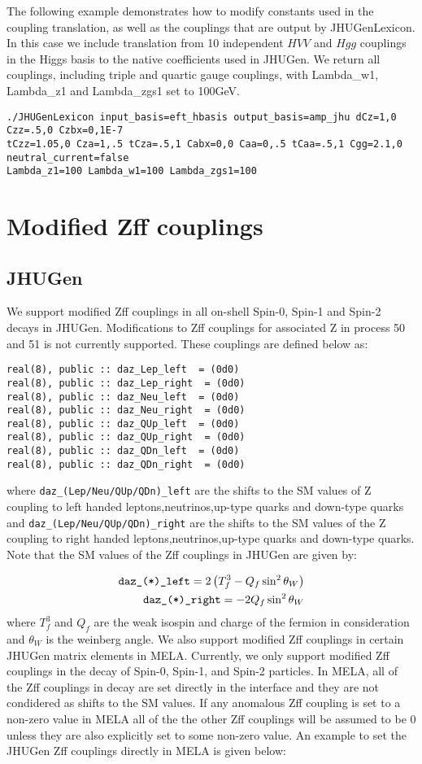 \documentclass[aps,superscriptaddress,nofootinbib]{revtex4}
\begin{document}
The following example demonstrates how to modify constants used in the coupling translation, as well as the couplings that are 
output by JHUGenLexicon. In this case we include translation from 10 independent $HVV$ and $Hgg$ couplings in the Higgs basis 
to the native coefficients used in JHUGen. We return all couplings, including triple and quartic gauge couplings, 
with Lambda\_w1, Lambda\_z1 and Lambda\_zgs1 set to 100GeV.

\begin{verbatim}
./JHUGenLexicon input_basis=eft_hbasis output_basis=amp_jhu dCz=1,0 Czz=.5,0 Czbx=0,1E-7 
tCzz=1.05,0 Cza=1,.5 tCza=.5,1 Cabx=0,0 Caa=0,.5 tCaa=.5,1 Cgg=2.1,0 neutral_current=false 
Lambda_z1=100 Lambda_w1=100 Lambda_zgs1=100
\end{verbatim}

\section{Modified Zff couplings}
\subsection{JHUGen}
We support modified Zff couplings in all on-shell Spin-0, Spin-1 and Spin-2 decays in JHUGen. Modifications to Zff couplings for associated Z in process 50 and 51 is not currently supported.
These couplings are defined below as: 

\begin{verbatim}
real(8), public :: daz_Lep_left  = (0d0)
real(8), public :: daz_Lep_right  = (0d0)
real(8), public :: daz_Neu_left  = (0d0)
real(8), public :: daz_Neu_right  = (0d0)
real(8), public :: daz_QUp_left  = (0d0)
real(8), public :: daz_QUp_right  = (0d0)
real(8), public :: daz_QDn_left  = (0d0)
real(8), public :: daz_QDn_right  = (0d0)
\end{verbatim}
where \verb|daz_(Lep/Neu/QUp/QDn)_left| are the shifts to the SM values of Z coupling to left handed leptons,neutrinos,up-type quarks and down-type quarks and 
\verb|daz_(Lep/Neu/QUp/QDn)_right| are the shifts to the SM values of the Z coupling to right handed leptons,neutrinos,up-type quarks and down-type quarks.
Note that the SM values of the Zff couplings in JHUGen are given by:

\begin{eqnarray*}
\verb|daz_(*)_left| = 2 \left(T^{3}_{f}-Q_{f} \sin^2 \theta_{W}\right) \\
\verb|daz_(*)_right| = -2 Q_{f} \sin^2 \theta_{W}
\end{eqnarray*}
where $T^{3}_{f}$ and $Q_{f}$ are the weak isospin and charge of the fermion in consideration and $\theta_{W}$ is the weinberg angle.
We also support modified Zff couplings in certain JHUGen matrix elements in MELA. Currently, we only support modified Zff couplings in the decay of 
Spin-0, Spin-1, and Spin-2 particles. In MELA, all of the Zff couplings in decay are set directly in the interface and they are not condidered as shifts to the 
SM values. If any anomalous Zff coupling is set to a non-zero value in MELA all of the the other Zff couplings will be assumed to be 0
unless they are also explicitly set to some non-zero value. An example to set the JHUGen Zff couplings directly in MELA is given below: 
\end{document}
